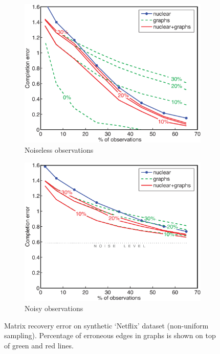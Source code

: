 \documentclass{article}
\begin{document}
\begin{figure}
\label{fig:art_non_uniform_all}
          \begin{subfigure}[b]{.5\linewidth}
            \centering \includegraphics[scale=.38, trim=0 0 0 0, clip=true]{non_uniform.eps}
            \caption{Noiseless observations}\label{fig:art_non_uniform}
          \end{subfigure}
          \begin{subfigure}[b]{.5\linewidth}
            \centering\includegraphics[scale=.38, trim=0 0 0 0, clip=true]{non_uniform_noisy.eps}
            \caption{Noisy observations}\label{fig:art_non_uniform_noisy}
          \end{subfigure}

        \caption{Matrix recovery error on synthetic `Netflix' dataset (non-uniform sampling). Percentage of erroneous edges in graphs is shown on top of green and red lines.}
	\vspace{-0.45cm}
\end{figure}
\end{document}
